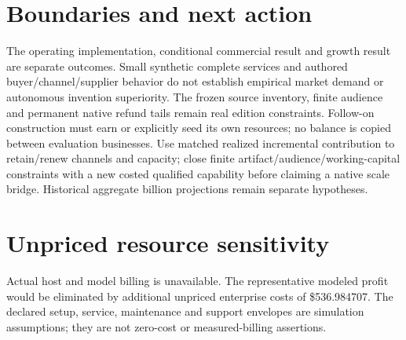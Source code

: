 \documentclass[10pt,letterpaper]{article}
\begin{document}
\section{Boundaries and next action}
The operating implementation, conditional commercial result and growth result are separate outcomes. Small synthetic complete services and authored buyer/channel/supplier behavior do not establish empirical market demand or autonomous invention superiority. The frozen source inventory, finite audience and permanent native refund tails remain real edition constraints. Follow-on construction must earn or explicitly seed its own resources; no balance is copied between evaluation businesses. Use matched realized incremental contribution to retain/renew channels and capacity; close finite artifact/audience/working-capital constraints with a new costed qualified capability before claiming a native scale bridge. Historical aggregate billion projections remain separate hypotheses.
\section{Unpriced resource sensitivity}
Actual host and model billing is unavailable. The representative modeled profit would be eliminated by additional unpriced enterprise costs of \$536.984707. The declared setup, service, maintenance and support envelopes are simulation assumptions; they are not zero-cost or measured-billing assertions.
\end{document}
